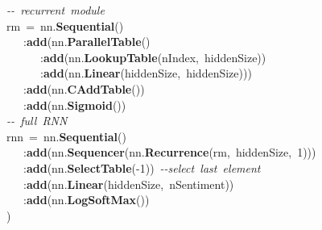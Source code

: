 \noindent
\mbox{}\textit{-\/-\ recurrent\ module} \\
\mbox{}rm\ =\ nn.\textbf{Sequential}() \\
\mbox{}\ \ \ :\textbf{add}(nn.\textbf{ParallelTable}() \\
\mbox{}\ \ \ \ \ \ :\textbf{add}(nn.\textbf{LookupTable}(nIndex,\ hiddenSize)) \\
\mbox{}\ \ \ \ \ \ :\textbf{add}(nn.\textbf{Linear}(hiddenSize,\ hiddenSize))) \\
\mbox{}\ \ \ :\textbf{add}(nn.\textbf{CAddTable}()) \\
\mbox{}\ \ \ :\textbf{add}(nn.\textbf{Sigmoid}()) \\
\mbox{}\textit{-\/-\ full\ RNN} \\
\mbox{}rnn\ =\ nn.\textbf{Sequential}() \\
\mbox{}\ \ \ :\textbf{add}(nn.\textbf{Sequencer}(nn.\textbf{Recurrence}(rm,\ hiddenSize,\ 1))) \\
\mbox{}\ \ \ :\textbf{add}(nn.\textbf{SelectTable}(-1))\ \textit{-\/-select\ last\ element} \\
\mbox{}\ \ \ :\textbf{add}(nn.\textbf{Linear}(hiddenSize,\ nSentiment)) \\
\mbox{}\ \ \ :\textbf{add}(nn.\textbf{LogSoftMax}()) \\
\mbox{})
